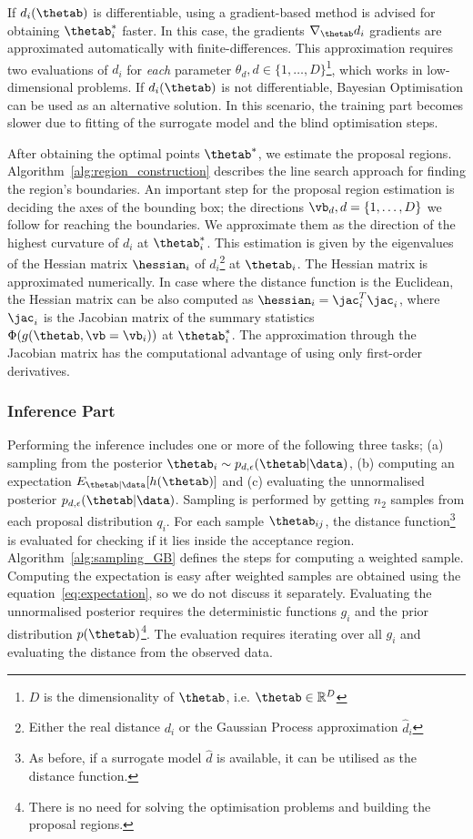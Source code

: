 If \(d_i(\thetab)\) is differentiable, using a gradient-based method
is advised for obtaining \(\thetab_i^*\) faster. In this case, the
gradients \(\nabla_{\thetab} d_i\) gradients are approximated
automatically with finite-differences. This approximation requires two
evaluations of \(d_i\) for \emph{each} parameter
\(\theta_d, d \in \{1, \ldots, D\}\)\footnote{\(D\) is the
  dimensionality of \(\thetab\), i.e.  \(\thetab \in \mathbb{R}^D\)},
which works in low-dimensional problems. If \(d_i(\thetab)\) is not
differentiable, Bayesian Optimisation can be used as an alternative
solution. In this scenario, the training part becomes slower due to
fitting of the surrogate model and the blind optimisation steps.

After obtaining the optimal points \(\thetab^*\), we estimate the
proposal regions. Algorithm~\ref{alg:region_construction} describes
the line search approach for finding the region's boundaries. An
important step for the proposal region estimation is deciding the axes
of the bounding box; the directions \(\vb_d, d = \{1, \ldots, D\}\) we
follow for reaching the boundaries. We approximate them as the
direction of the highest curvature of \(d_i\) at \(\thetab_i^*\). This
estimation is given by the eigenvalues of the Hessian matrix
\(\hessian_i\) of \(d_i\)\footnote{Either the real distance \(d_i\) or
  the Gaussian Process approximation \(\hat{d}_i\)} at
\(\thetab_i\). The Hessian matrix is approximated numerically. In case
where the distance function is the Euclidean, the Hessian matrix can
be also computed as \(\hessian_i = \jac_i^T\jac_i\), where \(\jac_i\)
is the Jacobian matrix of the summary statistics
\(\Phi(g(\thetab, \vb=\vb_i))\) at \(\thetab_i^*\). The approximation
through the Jacobian matrix has the computational advantage of using
only first-order derivatives.

\subsubsection*{Inference Part}
Performing the inference includes one or more of the following three
tasks; (a) sampling from the posterior
\( \thetab_i \sim p_{d, \epsilon}(\thetab|\data)\), (b) computing an
expectation \(E_{\thetab|\data}[h(\thetab)]\) and (c) evaluating the
unnormalised posterior \(p_{d, \epsilon}(\thetab|\data)\). Sampling is
performed by getting \(n_2\) samples from each proposal distribution
\(q_i\). For each sample \(\thetab_{ij}\), the distance
function\footnote{As before, if a surrogate model \(\hat{d}\) is
  available, it can be utilised as the distance function.} is
evaluated for checking if it lies inside the acceptance
region. Algorithm~\ref{alg:sampling_GB} defines the steps for
computing a weighted sample. Computing the expectation is easy after
weighted samples are obtained using the equation~\ref{eq:expectation},
so we do not discuss it separately. Evaluating the unnormalised
posterior requires the deterministic functions \(g_i\) and the prior
distribution \(p(\thetab)\)\footnote{There is no need for solving the
  optimisation problems and building the proposal regions.}. The
evaluation requires iterating over all \(g_i\) and evaluating the
distance from the observed data.


